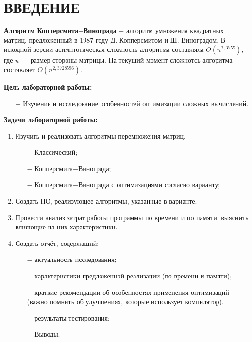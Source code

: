 \chapter*{ВВЕДЕНИЕ}

\textbf{Алгоритм Копперсмита$-$Винограда}\cite{winograd} $-$ алгоритм умножения квадратных матриц, предложенный в 1987 году Д. Копперсмитом и Ш. Виноградом.
В исходной версии асимптотическая сложность алгоритма составляла $O(n^{2,3755})$, где  $n$ — размер стороны матрицы.
На текущий момент сложнотсь алгоритма составляет $O(n^{2,3728596})$.

\textbf{Цель лабораторной работы:}
\begin{itemize}
    \item[$-$] Изучение и исследование особенностей оптимизации сложных вычислений.
\end{itemize}

\textbf{Задачи лабораторной работы:}
\begin{enumerate}
\item Изучить и реализовать алгоритмы перемножения матриц.
\begin{enumerate}
    \item[$-$] Классический;
    \item[$-$] Копперсмита$-$Винограда;
    \item[$-$] Копперсмита$-$Винограда с оптимизациями согласно варианту;
\end{enumerate}
\item Создать ПО, реализующее алгоритмы, указанные в варианте.
\item Провести анализ затрат работы программы по времени и по памяти, выяснить влияющие на них характеристики.
    \item Создать отчёт, содержащий:
    \begin{enumerate}
        \item[$-$] актуальность исследования;
        \item[$-$] характеристики предложенной реализации (по времени и памяти);
        \item[$-$] краткие рекомендации об особенностях применения оптимизаций (важно помнить об улучшениях, которые использует компилятор).
        \item[$-$] результаты тестирования;
        \item[$-$] Выводы.
    \end{enumerate}
\end{enumerate}

